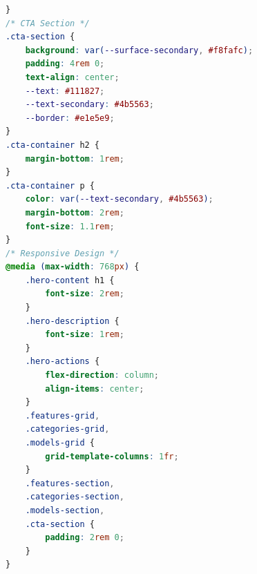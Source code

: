 \documentclass[12pt, a4paper, onecolumn]{report}
\begin{document}
\begin{lstlisting}[language=CSS]
}
/* CTA Section */
.cta-section {
    background: var(--surface-secondary, #f8fafc);
    padding: 4rem 0;
    text-align: center;
    --text: #111827;
    --text-secondary: #4b5563;
    --border: #e1e5e9;
}
.cta-container h2 {
    margin-bottom: 1rem;
}
.cta-container p {
    color: var(--text-secondary, #4b5563);
    margin-bottom: 2rem;
    font-size: 1.1rem;
}
/* Responsive Design */
@media (max-width: 768px) {
    .hero-content h1 {
        font-size: 2rem;
    }
    .hero-description {
        font-size: 1rem;
    }
    .hero-actions {
        flex-direction: column;
        align-items: center;
    }
    .features-grid,
    .categories-grid,
    .models-grid {
        grid-template-columns: 1fr;
    }
    .features-section,
    .categories-section,
    .models-section,
    .cta-section {
        padding: 2rem 0;
    }
}
\end{lstlisting}
\end{document}
